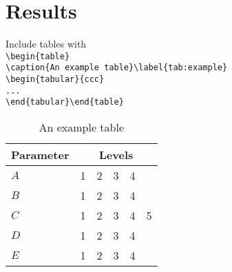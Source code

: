 \chapter{Results}\label{chapter:Results}
Include tables with\\
\verb+\begin{table}+\\
\verb+\caption{An example table}\label{tab:example}+\\
\verb+\begin{tabular}{ccc}+\\
\verb+...+\\
\verb+\end{tabular}\end{table}+

\begin{table}[h]
\centering
\caption{An example table}\label{tab:example}
\begin{tabular}{lccccc}
\toprule
Parameter&\multicolumn{5}{c}{Levels}\\
\midrule
$A$&1&2&3&4&\\
$B$&1&2&3&4&\\
$C$&1&2&3&4&5\\
\midrule
$D$&1&2&3&4&\\
$E$&1&2&3&4&\\
\bottomrule
\end{tabular}
\end{table}